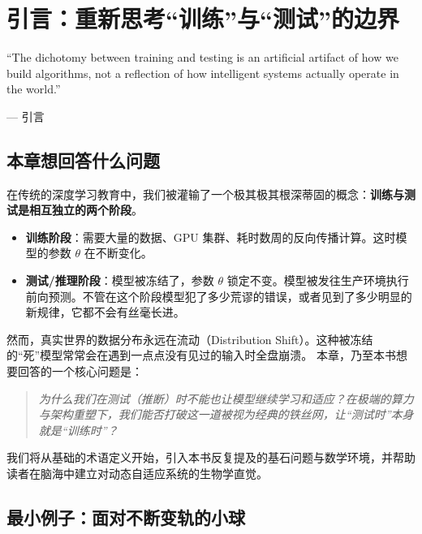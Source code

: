 \chapter{引言：重新思考“训练”与“测试”的边界}
\label{ch:intro}

\epigraph{``The dichotomy between training and testing is an artificial artifact of how we build algorithms, not a reflection of how intelligent systems actually operate in the world.''}{--- 引言}

\section{本章想回答什么问题}

在传统的深度学习教育中，我们被灌输了一个极其极其根深蒂固的概念：\textbf{训练与测试是相互独立的两个阶段}。
\begin{itemize}
    \item \textbf{训练阶段}：需要大量的数据、GPU 集群、耗时数周的反向传播计算。这时模型的参数 $\theta$ 在不断变化。
    \item \textbf{测试/推理阶段}：模型被冻结了，参数 $\theta$ 锁定不变。模型被发往生产环境执行前向预测。不管在这个阶段模型犯了多少荒谬的错误，或者见到了多少明显的新规律，它都不会有丝毫长进。
\end{itemize}

然而，真实世界的数据分布永远在流动（Distribution Shift）。这种被冻结的“死”模型常常会在遇到一点点没有见过的输入时全盘崩溃。
本章，乃至本书想要回答的一个核心问题是：
\begin{quote}
\textit{为什么我们在测试（推断）时不能也让模型继续学习和适应？在极端的算力与架构重塑下，我们能否打破这一道被视为经典的铁丝网，让“测试时”本身就是“训练时”？}
\end{quote}

我们将从基础的术语定义开始，引入本书反复提及的基石问题与数学环境，并帮助读者在脑海中建立对动态自适应系统的生物学直觉。

\section{最小例子：面对不断变轨的小球}
\label{sec:intro_minimal}

